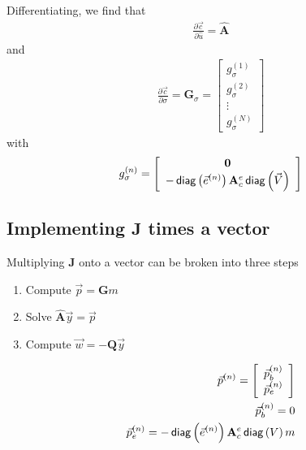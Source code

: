\documentclass[]{article}
\newcommand{\Ace}{{\mathbf A_c^e}}
\newcommand{\diag}[1]{\,{\sf diag}\left( #1 \right)}
\newcommand {\e}  { {\vec e} }
\begin{document}
Differentiating, we find that
\begin{align}
    \frac{\partial \vec{c}}{\partial \hat{u}} = \hat{\mathbf{A}}
\end{align}
and
\begin{align}
    \frac{\partial \vec{c}}{\partial \sigma} = \mathbf{G}_\sigma =
    \left[
        \begin{array}{c}
            g_\sigma^{(1)}\\
            g_\sigma^{(2)}\\
            \vdots \\
            g_\sigma^{(N)}
        \end{array}
    \right]
\end{align}
with
\begin{subequations}
    \begin{align}
        g_\sigma^{(n)} =
        \left[
            \begin{array}{c}
                \mathbf{0} \\
                - \diag{\e^{(n)}} \Ace \diag{\vec{V}}
            \end{array}
        \right]
    \end{align}
\end{subequations}

\subsection{Implementing $\mathbf{J}$ times a vector}
Multiplying $\mathbf{J}$ onto a vector can be broken into three steps
\begin{enumerate}
\item Compute $\vec{p} = \mathbf{G}m$
\item Solve $\hat{\mathbf{A}} \vec{y} = \vec{p}$
\item Compute $\vec{w} = -\mathbf{Q} \vec{y}$
\end{enumerate}

\begin{subequations}
    \begin{align}
        \vec{p}^{(n)} = \left[
            \begin{array}{c}
                \vec{p}_b^{(n)} \\
                \vec{p}_e^{(n)}
            \end{array}
        \right] \\
        \vec{p}_b^{(n)} = 0 \\
        \vec{p}_e^{(n)} = - \diag{\e^{(n)}} \Ace \diag{V} m 
    \end{align}
\end{subequations}
\end{document}
